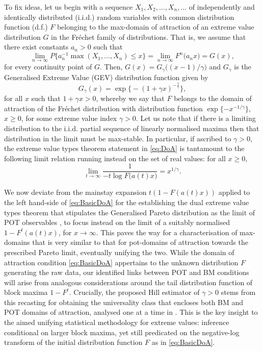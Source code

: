 \documentclass[11pt, a4paper, oneside]{article}
\numberwithin{equation}{section}
\theoremstyle{plain}
\theoremstyle{definition}
\newcommand{\limit}[1]{\ensuremath{\displaystyle {\lim_{#1 \rightarrow{\infty}}}}}
\begin{document}
To fix ideas, let us begin with a sequence $X_1,X_2, \ldots , X_n, \dots$ of independently and identically distributed (i.i.d.) random variables with common distribution function (d.f.) $F$ belonging to the max-domain of attraction of an extreme value distribution $G$ in the Fr\'echet family of distributions. That is, we assume that there exist constants $a_n>0$ such that
\begin{equation}\label{eq:DoA}
\limit{n} P\bigl\{ a_n^{-1}\max(X_1, \ldots, X_n) \leq x \bigr\} =  \limit{n} F^n\bigl(a_n x\bigr) = G(x),
\end{equation}
for every continuity point of  $G$. Then, $G(x)=G_{\gamma}\bigl((x-1)/\gamma\bigr)$ and $G_\gamma$ is the Generalised Extreme Value (GEV) distribution function given by
\begin{equation*}
    G_\gamma(x)=\exp\bigl\{-(1+\gamma x)^{-\frac{1}{\gamma}}\bigr\},
\end{equation*}
for all $x$ such that $1+\gamma x>0$, whereby we say that $F$ belongs to the domain of attraction of the Fr\'echet distribution with distribution function $\exp\{-x^{-1/\gamma}\}$, $x\geq 0$, for some extreme value index $\gamma>0$. Let us note that if there is a limiting distribution to the i.i.d. partial sequence of linearly normalised maxima then that distribution in the limit must be max-stable. In particular, if ascribed to $\gamma >0$, the extreme value types theorem  \citep[due in various degrees of
generality to][]{FisherTippett28,Gnedenko43,deHaan1970} statement in \eqref{eq:DoA} is tantamount to the following limit relation running instead on the set of real values: for all $x \geq 0$,
\begin{equation}\label{eq:BasicDoA}
	\limit{t} \frac{1}{-t \log F \bigl(a(t)x \bigr)} = x^{1/\gamma}.
\end{equation}

We now deviate from the mainstay expansion $t (1- F(a(t)x))$ applied to the left hand-side of \eqref{eq:BasicDoA} for the establishing the dual extreme value types theorem that stipulates the Generalised Pareto distribution as the limit of POT observables \citep[cf.][Section~1.1.2 see p.177, e.g.]{deHaanFerreira2006}, to focus instead on the limit of a suitably normalised $1-F^{t}(a(t)x)$, for $x \rightarrow \infty$.
This paves the way for a characterisation of max-domains that is very similar to that for pot-domains of attraction towards the prescribed Pareto limit, eventually unifying the two. While the domain of attraction condition \eqref{eq:BasicDoA} appertains to the unknown distribution $F$ generating the raw data, our identified links between POT and BM conditions will arise from analogous considerations around the tail distribution function of block maxima $1-F^t$. Crucially, the proposed Hill estimator of $\gamma>0$ stems from this recasting for obtaining the universality class that encloses both BM and POT domains of attraction, analysed one at a time in \citet{BucherZhou2021}. This is the key insight to the aimed unifying statistical methodology for extreme values: inference conditional on larger block maxima, yet still predicated on the negative-log transform of the initial distribution function $F$ as in \eqref{eq:BasicDoA}.
\end{document}

